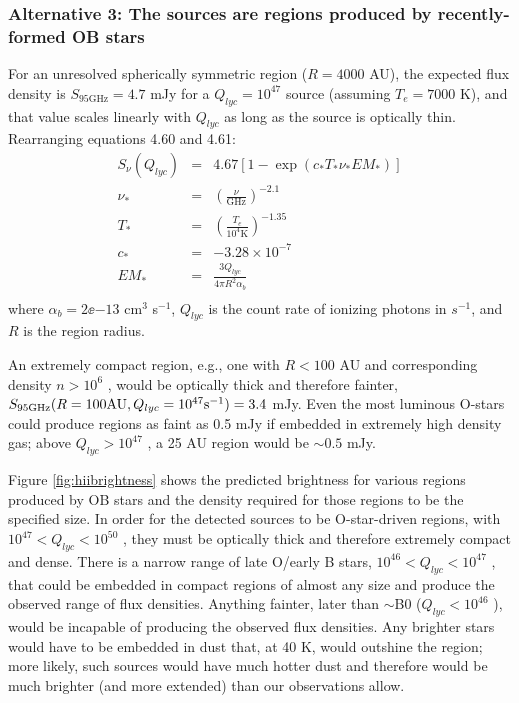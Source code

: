 \documentclass[twocolumn]{aastex61}
\begin{document}
\subsubsection{Alternative 3: The sources are \hii regions produced by
recently-formed OB stars}
\label{sec:theyarehiiregions}

For an unresolved spherically symmetric \hii region ($R=4000$ AU), the expected
flux density is $S_{95 \mathrm{GHz}} = 4.7$ mJy for a $Q_{lyc}=10^{47}$ \pers
source (assuming $T_e=7000$ K), and that value scales linearly with $Q_{lyc}$
as long as the source is optically thin.  Rearranging \citet{Condon2007a} equations
4.60 and 4.61:
\begin{eqnarray}
S_{\nu}(Q_{lyc})  &=& 4.67 \left[1-\exp\left(c_* T_* \nu_* EM_* \right) \right] \nonumber \\
\nu_* &=& \left(\frac{\nu}{\mathrm{GHz}}\right)^{-2.1} \nonumber \\
T_* &=& \left(\frac{T_e}{10^4 \mathrm{K}}\right)^{-1.35} \nonumber \\
c_* &=& -3.28\times10^{-7} \nonumber \\
EM_* &=& \frac{3 Q_{lyc}}{4 \pi R^2 \alpha_b} \nonumber \\
\end{eqnarray}
where $\alpha_b=2\ee{-13}$ cm$^3$ s$^{-1}$, $Q_{lyc}$ is the count rate
of ionizing photons in $s^{-1}$, and $R$ is the \hii region radius.

An extremely compact \hii region,
e.g., one with $R<100$ AU and corresponding density $n>10^6$ \percc, would be
optically thick and therefore fainter, $S_{95 \mathrm{GHz}}(R=100 \mathrm{AU},
Q_{lyc}=10^{47} \mathrm{s}^{-1})=3.4$ mJy.  Even the most luminous O-stars could produce \hii
regions as faint as 0.5 mJy if embedded in extremely high density gas; above
$Q_{lyc}>10^{47}$ \pers, a 25 AU \hii region would be $\sim0.5$ mJy.

Figure \ref{fig:hiibrightness} shows the predicted brightness for various \hii
regions produced by OB stars and the density required for those \hii regions
to be the specified size.  In
order for the detected sources to be O-star-driven \hii regions, with $10^{47}
< Q_{lyc} < 10^{50}$ \pers, they must be optically thick and therefore
extremely compact and dense.  There is a narrow range of late O/early B stars,
$10^{46} < Q_{lyc} < 10^{47}$ \pers, that could be embedded in compact \hii
regions of almost any size and produce the observed range of flux densities.
Anything fainter, later than $\sim$B0 ($Q_{lyc}<10^{46}$ \pers), would be
incapable of producing the observed flux densities.
Any brighter stars would have to be embedded in dust that, at 40 K, would
outshine the \hii region; more likely, such sources would have much hotter dust
and therefore would be much brighter (and more extended) than our observations
allow.
\end{document}

